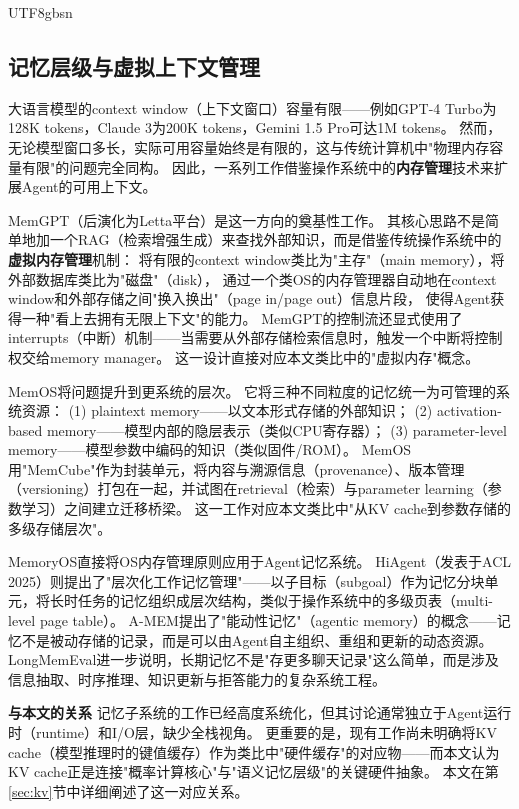 \documentclass[11pt,a4paper]{article}
\begin{document}
\begin{CJK*}{UTF8}{gbsn}
\subsection{记忆层级与虚拟上下文管理}
\label{sec:related-memory}

大语言模型的context window（上下文窗口）容量有限——例如GPT-4 Turbo为128K tokens，Claude 3为200K tokens，Gemini 1.5 Pro可达1M tokens\cite{gemini2024}。
然而，无论模型窗口多长，实际可用容量始终是有限的，这与传统计算机中"物理内存容量有限"的问题完全同构。
因此，一系列工作借鉴操作系统中的\textbf{内存管理}技术来扩展Agent的可用上下文。

MemGPT\cite{memgpt2023}（后演化为Letta平台）是这一方向的奠基性工作。
其核心思路不是简单地加一个RAG（检索增强生成）\cite{lewis2020rag}来查找外部知识，而是借鉴传统操作系统中的\textbf{虚拟内存管理}机制：
将有限的context window类比为"主存"（main memory），将外部数据库类比为"磁盘"（disk），
通过一个类OS的内存管理器自动地在context window和外部存储之间"换入换出"（page in/page out）信息片段，
使得Agent获得一种"看上去拥有无限上下文"的能力。
MemGPT的控制流还显式使用了interrupts（中断）机制——当需要从外部存储检索信息时，触发一个中断将控制权交给memory manager。
这一设计直接对应本文类比中的"虚拟内存"概念。

MemOS\cite{memos2025}将问题提升到更系统的层次。
它将三种不同粒度的记忆统一为可管理的系统资源：
(1) plaintext memory——以文本形式存储的外部知识；
(2) activation-based memory——模型内部的隐层表示（类似CPU寄存器）；
(3) parameter-level memory——模型参数中编码的知识（类似固件/ROM）。
MemOS用"MemCube"作为封装单元，将内容与溯源信息（provenance）、版本管理（versioning）打包在一起，并试图在retrieval（检索）与parameter learning（参数学习）之间建立迁移桥梁。
这一工作对应本文类比中"从KV cache到参数存储的多级存储层次"。

MemoryOS\cite{memoryos2025}直接将OS内存管理原则应用于Agent记忆系统。
HiAgent\cite{hiagent2024}（发表于ACL 2025）则提出了"层次化工作记忆管理"——以子目标（subgoal）作为记忆分块单元，将长时任务的记忆组织成层次结构，类似于操作系统中的多级页表（multi-level page table）。
A-MEM\cite{amem2025}提出了"能动性记忆"（agentic memory）的概念——记忆不是被动存储的记录，而是可以由Agent自主组织、重组和更新的动态资源。
LongMemEval\cite{longmemeval2024}进一步说明，长期记忆不是"存更多聊天记录"这么简单，而是涉及信息抽取、时序推理、知识更新与拒答能力的复杂系统工程。

\textbf{与本文的关系}
记忆子系统的工作已经高度系统化，但其讨论通常独立于Agent运行时（runtime）和I/O层，缺少全栈视角。
更重要的是，现有工作尚未明确将KV cache（模型推理时的键值缓存）作为类比中"硬件缓存"的对应物——而本文认为KV cache正是连接"概率计算核心"与"语义记忆层级"的关键硬件抽象。
本文在第\ref{sec:kv}节中详细阐述了这一对应关系。


\end{CJK*}
\end{document}
